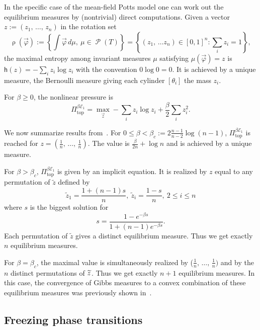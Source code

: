 \documentclass[AHL, Unicode, longabstracts,published]{cedram}
\theoremstyle{plain}
\theoremstyle{plain}
\newcommand\NLP{\Pi}
\renewcommand\top{{\mathrm{top}}}
\newcommand\Prob{{\operatorname{\mathscr{P}}}}
\newcommand{\rs}{\operatorname{\rho}}
\newcommand{\hf}{\mathsf{h}}
\newcommand{\pot}{\varphi}
\newcounter{In}
\newcommand*\be{\beta}
\newcommand*\8{\infty}
\newcommand{\En}{\mathcal{E}}
\let\oldtilde\tilde
\renewcommand*{\tilde}[1]{\mathchoice{\widetilde{#1}}{\widetilde{#1}}{\oldtilde{#1}}{\oldtilde{#1}}}
\begin{document}
In the specific case of the mean-field Potts model one can work out the equilibrium measures by (nontrivial) direct computations. Given a vector $z:=(z_{1},\,\ldots,\,z_{n})$ in the rotation set
\[
\rs(\vec\pot) :=\left\{\int\vec\pot\,d\mu,\ \mu\in\Prob(T)\right\} = \left\{(z_1,\,\dots z_n) \in [0,1]^n \colon \sum_i z_i = 1\right\},
\]
the maximal entropy among invariant measures $\mu$ satisfying $\mu(\vec\pot)=z$ is $\hf(z)=-\sum_{i}z_{i}\log z_{i}$ with the convention $0\log 0=0$. It is achieved by a unique measure, the Bernoulli measure giving each cylinder $[\theta_i]$ the mass $z_i$.

For $\be\ge 0$, the nonlinear pressure is
\[
\NLP_\top^{\beta\En_1}=\max_{\vec z}-\sum_{i}z_{i}\log z_{i}+\frac{\be}{2}\sum_{i}z_{i}^{2}.
\]


We now summarize results from~\cite{EllisWang90}. For $0 \le \be<\be_{c}:= 2\frac{n-1}{n-2}\log(n-1)$, $\NLP_{\top}^{\beta\En_1}$ is reached for $z=(\frac1n,\,\dots,\,\frac1n)$. The value is $\frac\be{2n}+\log n$ and is achieved by a unique measure.

For $\be>\be_{c}$, $\NLP_{\top}^{ \beta\En_1}$ is given by an implicit equation. It is realized by $z$ equal to any permutation of $\widetilde{z}$ defined by
\[
\widetilde{z}_{1}=\frac{1+(n-1)s}n,\ \widetilde{z}_{i}=\frac{1-s}n,\ 2\le i\le n
\]
where $s$ is the biggest solution for
\[
s=\frac{1-e^{-\be s}}{1+(n-1)e^{-\be s}}.
\]
Each permutation of $\widetilde{z}$ gives a distinct equilibrium measure. Thus we get exactly $n$ equilibrium measures.

For $\be=\be_{c}$, the maximal value is simultaneously realized by ($\frac1n,\,\ldots,\,\frac1n)$ and by the $n$ distinct permutations of $\tilde z$. Thus we get exactly $n+1$ equilibrium measures. In this case, the convergence of Gibbs measures to a convex combination of these equilibrium measures was previously shown in~\cite{Leplaideur-Watbled-2}.



\subsection{Freezing phase transitions}\label{sec:transition}
\end{document}
